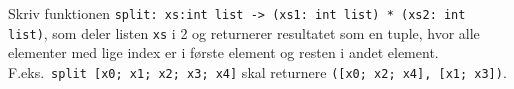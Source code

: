 Skriv funktionen \lstinline{split: xs:int list -> (xs1: int list) * (xs2: int list)}, som deler listen \lstinline{xs} i 2 og returnerer resultatet som en tuple, hvor alle elementer med lige index er i første element og resten i andet element. F.eks.\ \mbox{\lstinline{split [x0; x1; x2; x3; x4]}} skal returnere \mbox{\lstinline{([x0; x2; x4], [x1; x3])}}.
